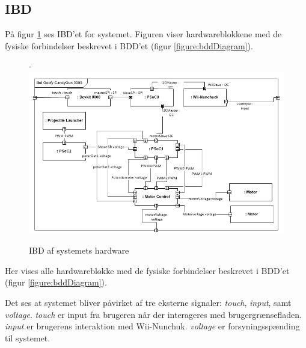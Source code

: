 \subsection{IBD}
\label{afsnit:IBD}

På figur \ref{figure:ibdDiagram} ses IBD'et for systemet. Figuren viser hardwareblokkene med de fysiske forbindelser beskrevet i BDD'et (figur \ref{figure:bddDiagram}). 

\begin{figure}[H]
	\begin{adjustwidth}{-3cm}{-\rightmargin}
	\centering
	\includegraphics[width=0.9\paperwidth]{SystemArkitektur/images/jgjgj}
	\caption{IBD af systemets hardware}
	\label{figure:ibdDiagram}
	\end{adjustwidth}	
\end{figure}

Her vises alle hardwareblokke med de fysiske forbindelser beskrevet i BDD'et (figur \ref{figure:bddDiagram}). 

Det ses at systemet bliver påvirket af tre eksterne signaler: \textit{touch}, \textit{input}, samt \textit{voltage}. \textit{touch} er input fra brugeren når der interageres med brugergrænsefladen. \textit{input} er brugerens interaktion med Wii-Nunchuk. \textit{voltage} er forsyningsspænding til systemet.

\newpage
